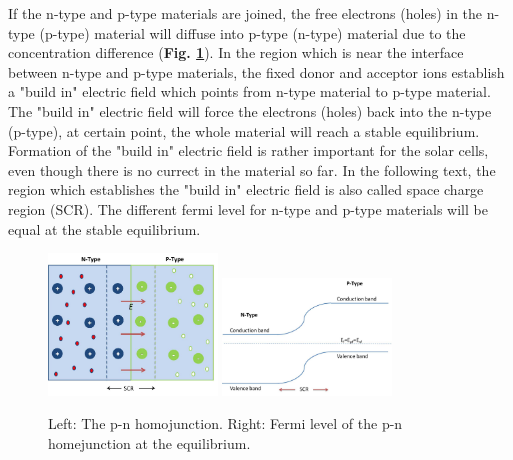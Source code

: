 \documentclass[a4paper, 12pt, titlepage,oneside,drop]{kthesis}
\begin{document}
If the n-type and p-type materials are joined, the free electrons (holes) in the n-type (p-type) material will diffuse into p-type (n-type) material due to the concentration difference (\textbf{Fig. \ref{pnjunction}}). In the region which is near the interface between n-type and
p-type materials, the fixed donor and acceptor ions establish a "build in" electric field which points from n-type material to p-type material. The "build in" electric field will force the electrons (holes) back into the n-type (p-type), at certain
point, the whole material will reach a stable equilibrium. Formation of the "build in" electric field is rather important for the solar cells, even though there is no currect in the material so far. In the following text, the region which establishes
the "build in" electric field is also called space charge region (SCR). The different fermi level for n-type and p-type materials will be equal at the stable equilibrium. 



\begin{figure}[H]
    \begin{center}
            \includegraphics[width=0.4\textwidth,clip]{pnjunction.jpg}
            \includegraphics[width=0.4\textwidth,clip]{pnjunction1.jpg}
     \end{center}
    \caption{Left: The p-n homojunction. Right: Fermi level of the p-n homejunction at the equilibrium. }      
    \label{pnjunction}
\end{figure}
\end{document}
